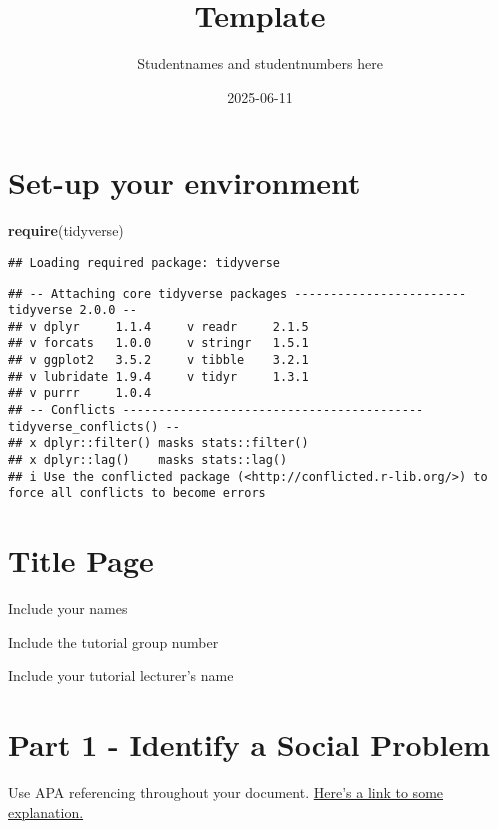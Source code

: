 \documentclass[
]{article}
\title{Template}
\author{Studentnames and studentnumbers here}
\date{2025-06-11}
\newenvironment{Shaded}{\begin{snugshade}}{\end{snugshade}}
\newcommand{\FunctionTok}[1]{\textcolor[rgb]{0.13,0.29,0.53}{\textbf{#1}}}
\newcommand{\NormalTok}[1]{#1}
\begin{document}
\maketitle

\section{Set-up your environment}\label{set-up-your-environment}

\begin{Shaded}
\begin{Highlighting}[]
\FunctionTok{require}\NormalTok{(tidyverse)}
\end{Highlighting}
\end{Shaded}

\begin{verbatim}
## Loading required package: tidyverse
\end{verbatim}

\begin{verbatim}
## -- Attaching core tidyverse packages ------------------------ tidyverse 2.0.0 --
## v dplyr     1.1.4     v readr     2.1.5
## v forcats   1.0.0     v stringr   1.5.1
## v ggplot2   3.5.2     v tibble    3.2.1
## v lubridate 1.9.4     v tidyr     1.3.1
## v purrr     1.0.4     
## -- Conflicts ------------------------------------------ tidyverse_conflicts() --
## x dplyr::filter() masks stats::filter()
## x dplyr::lag()    masks stats::lag()
## i Use the conflicted package (<http://conflicted.r-lib.org/>) to force all conflicts to become errors
\end{verbatim}

\section{Title Page}\label{title-page}

Include your names

Include the tutorial group number

Include your tutorial lecturer's name

\section{Part 1 - Identify a Social
Problem}\label{part-1---identify-a-social-problem}

Use APA referencing throughout your document.
\href{https://www.mendeley.com/guides/apa-citation-guide/}{Here's a link
to some explanation.}
\end{document}
